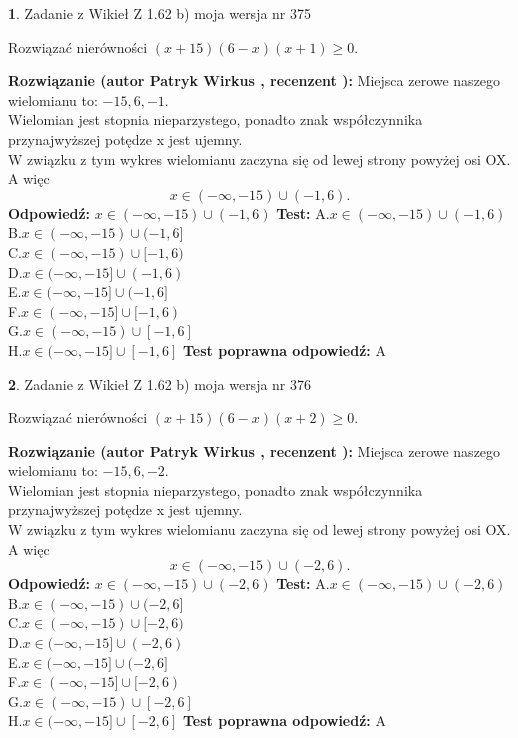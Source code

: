 \documentclass[12pt, a4paper]{article}
\theoremstyle{definition} %
\newtheorem{zad}{}
\newcommand{\zadStart}[1]{\begin{zad}#1\newline}
\newcommand{\zadStop}{\end{zad}}
\newcommand{\rozwStart}[2]{\noindent \textbf{Rozwiązanie (autor #1 , recenzent #2): }\newline}
\newcommand{\rozwStop}{\newline}
\newcommand{\odpStart}{\noindent \textbf{Odpowiedź:}\newline}
\newcommand{\odpStop}{\newline}
\newcommand{\testStart}{\noindent \textbf{Test:}\newline}
\newcommand{\testStop}{\newline}
\newcommand{\kluczStart}{\noindent \textbf{Test poprawna odpowiedź:}\newline}
\newcommand{\kluczStop}{\newline}
\begin{document}
\zadStart{Zadanie z Wikieł Z 1.62 b) moja wersja nr 375}

Rozwiązać nierówności $(x+15)(6-x)(x+1)\ge0$.
\zadStop
\rozwStart{Patryk Wirkus}{}
Miejsca zerowe naszego wielomianu to: $-15, 6, -1$.\\
Wielomian jest stopnia nieparzystego, ponadto znak współczynnika przy\linebreak najwyższej potędze x jest ujemny.\\ W związku z tym wykres wielomianu zaczyna się od lewej strony powyżej osi OX. A więc $$x \in (-\infty,-15) \cup (-1,6).$$
\rozwStop
\odpStart
$x \in (-\infty,-15) \cup (-1,6)$
\odpStop
\testStart
A.$x \in (-\infty,-15) \cup (-1,6)$\\
B.$x \in (-\infty,-15) \cup (-1,6]$\\
C.$x \in (-\infty,-15) \cup [-1,6)$\\
D.$x \in (-\infty,-15] \cup (-1,6)$\\
E.$x \in (-\infty,-15] \cup (-1,6]$\\
F.$x \in (-\infty,-15] \cup [-1,6)$\\
G.$x \in (-\infty,-15) \cup [-1,6]$\\
H.$x \in (-\infty,-15] \cup [-1,6]$
\testStop
\kluczStart
A
\kluczStop



\zadStart{Zadanie z Wikieł Z 1.62 b) moja wersja nr 376}

Rozwiązać nierówności $(x+15)(6-x)(x+2)\ge0$.
\zadStop
\rozwStart{Patryk Wirkus}{}
Miejsca zerowe naszego wielomianu to: $-15, 6, -2$.\\
Wielomian jest stopnia nieparzystego, ponadto znak współczynnika przy\linebreak najwyższej potędze x jest ujemny.\\ W związku z tym wykres wielomianu zaczyna się od lewej strony powyżej osi OX. A więc $$x \in (-\infty,-15) \cup (-2,6).$$
\rozwStop
\odpStart
$x \in (-\infty,-15) \cup (-2,6)$
\odpStop
\testStart
A.$x \in (-\infty,-15) \cup (-2,6)$\\
B.$x \in (-\infty,-15) \cup (-2,6]$\\
C.$x \in (-\infty,-15) \cup [-2,6)$\\
D.$x \in (-\infty,-15] \cup (-2,6)$\\
E.$x \in (-\infty,-15] \cup (-2,6]$\\
F.$x \in (-\infty,-15] \cup [-2,6)$\\
G.$x \in (-\infty,-15) \cup [-2,6]$\\
H.$x \in (-\infty,-15] \cup [-2,6]$
\testStop
\kluczStart
A
\kluczStop
\end{document}
